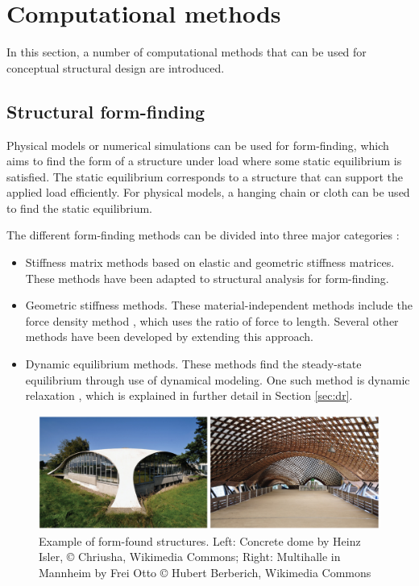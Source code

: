 \chapter{Computational methods}
\label{ch:Computational methods}
In this section, a number of computational methods that can be used for conceptual structural design are introduced. 

\section{Structural form-finding}
Physical models or numerical simulations can be used for form-finding, which aims to find the form of a structure under load where some static equilibrium is satisfied. The static equilibrium corresponds to a structure that can support the applied load efficiently. For physical models, a hanging chain or cloth can be used to find the static equilibrium.

The different form-finding methods can be divided into three major categories \cite{Veenendaal2012a}: 

\begin{itemize} 
\item Stiffness matrix methods based on elastic and geometric stiffness matrices. These methods have been adapted to structural analysis for form-finding.
\item Geometric stiffness methods. These material-independent methods include the force density method \cite{Schek1974}, which uses the ratio of force to length. Several other methods have been developed by extending this approach.
\item Dynamic equilibrium methods. These methods find the steady-state equilibrium through use of dynamical modeling. One such method is dynamic relaxation \cite{Day1965}, which is explained in further detail in Section \ref{sec:dr}.
\end{itemize} 

\begin{figure}
  \includegraphics[width=380pt]{graphics/formfinding-ex.jpg}
  \caption{Example of form-found structures. Left: Concrete dome by Heinz Isler, © Chriusha, Wikimedia Commons; Right: Multihalle in Mannheim by Frei Otto © Hubert Berberich, Wikimedia Commons}
  \label{fig:Stevin}
\end{figure}


